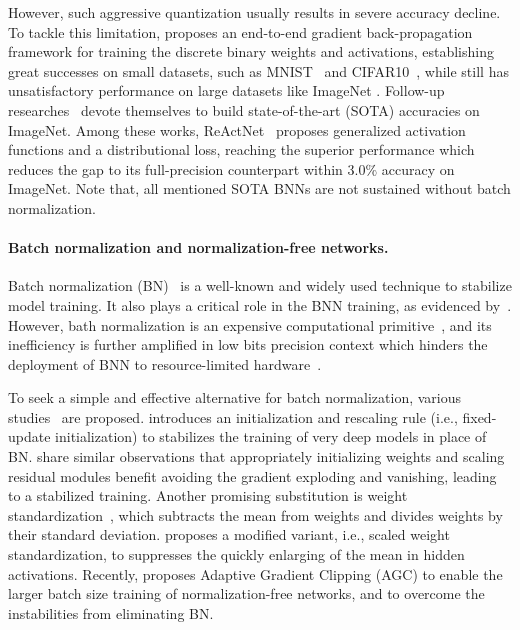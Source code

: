 \documentclass[final]{cvpr}
\begin{document}
However, such aggressive quantization usually results in severe accuracy decline. To tackle this limitation, \cite{courbariaux2016binarized} proposes an end-to-end gradient back-propagation framework for training the discrete binary weights and activations, establishing great successes on small datasets, such as MNIST~\cite{umuroglu2017finn} and CIFAR10~\cite{wang2019learning}, while still has unsatisfactory performance on large datasets like ImageNet \cite{liu2020reactnet}. Follow-up researches~\cite{bulat2019xnor,gu2019projection,Martinez2020Training,liu2018bi,liu2020reactnet} devote themselves to build state-of-the-art (SOTA) accuracies on ImageNet. Among these works, ReActNet~\cite{liu2020reactnet} proposes generalized activation functions and a distributional loss, reaching the superior performance which reduces the gap to its full-precision counterpart within $3.0\%$ accuracy on ImageNet. Note that, all mentioned SOTA BNNs are not sustained without batch normalization.


\paragraph{Batch normalization and normalization-free networks.} Batch normalization (BN)~\cite{ioffe2015batch} is a well-known and widely used technique to stabilize model training. It also plays a critical role in the BNN training, as evidenced by~\cite{santurkar2018does}. However, bath normalization is an expensive computational primitive~\cite{gitman2017comparison}, and its inefficiency is further amplified in low bits precision context which hinders the deployment of BNN to resource-limited hardware~\cite{wu2018l1}.

To seek a simple and effective alternative for batch normalization, various studies~\cite{zhang2019fixup,bachlechner2020rezero,hanin2018start,qiao2019micro,brock2021characterizing,brock2021agc} are proposed. \cite{zhang2019fixup} introduces an initialization and rescaling rule (i.e., fixed-update initialization) to stabilizes the training of very deep models in place of BN. \cite{bachlechner2020rezero,hanin2018start} share similar observations that appropriately initializing weights and scaling residual modules benefit avoiding the gradient exploding and vanishing, leading to a stabilized training. Another promising substitution is weight standardization~\cite{qiao2019micro}, which subtracts the mean from weights and divides weights by their standard deviation. \cite{brock2021characterizing} proposes a modified variant, i.e., scaled weight standardization, to suppresses the quickly enlarging of the mean in hidden activations. Recently, \cite{brock2021agc} proposes Adaptive Gradient Clipping (AGC) to enable the larger batch size training of normalization-free networks, and to overcome the instabilities from eliminating BN.
\end{document}
